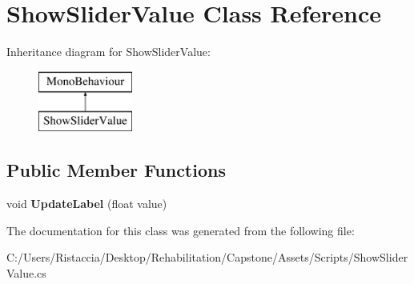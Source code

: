 \hypertarget{class_show_slider_value}{}\section{Show\+Slider\+Value Class Reference}
\label{class_show_slider_value}
Inheritance diagram for Show\+Slider\+Value\+:\begin{figure}[H]
\begin{center}
\leavevmode
\includegraphics[height=2.000000cm]{class_show_slider_value}
\end{center}
\end{figure}
\subsection*{Public Member Functions}
\begin{DoxyCompactItemize}
\item 
\mbox{\label{class_show_slider_value_a9d088b09bddda8a522e0fbca824eee53}} 
void {\bfseries Update\+Label} (float value)
\end{DoxyCompactItemize}


The documentation for this class was generated from the following file\+:\begin{DoxyCompactItemize}
\item 
C\+:/\+Users/\+Ristaccia/\+Desktop/\+Rehabilitation/\+Capstone/\+Assets/\+Scripts/Show\+Slider\+Value.\+cs\end{DoxyCompactItemize}
